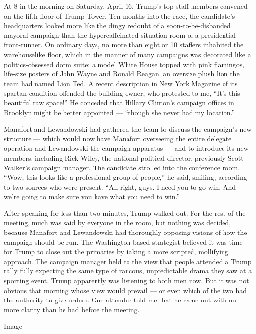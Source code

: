 At 8 in the morning on Saturday, April 16, Trump's top staff members
convened on the fifth floor of Trump Tower. Ten months into the race,
the candidate's headquarters looked more like the dingy redoubt of a
soon-to-be-disbanded mayoral campaign than the hypercaffeinated
situation room of a presidential front-runner. On ordinary days, no more
than eight or 10 staffers inhabited the warehouselike floor, which in
the manner of many campaigns was decorated like a politics-obsessed dorm
suite: a model White House topped with pink flamingos, life-size posters
of John Wayne and Ronald Reagan, an oversize plush lion the team had
named Lion Ted.
\href{http://nymag.com/daily/intelligencer/2016/04/inside-the-donald-trump-presidential-campaign.html}{A
recent description in New York Magazine} of its spartan condition
offended the building owner, who protested to me, ``It's this beautiful
raw space!'' He conceded that Hillary Clinton's campaign offices in
Brooklyn might be better appointed --- ``though she never had my
location.''

Manafort and Lewandowski had gathered the team to discuss the campaign's
new structure --- which would now have Manafort overseeing the entire
delegate operation and Lewandowski the campaign apparatus --- and to
introduce its new members, including Rick Wiley, the national political
director, previously Scott Walker's campaign manager. The candidate
strolled into the conference room. ``Wow, this looks like a professional
group of people,'' he said, smiling, according to two sources who were
present. ``All right, guys. I need you to go win. And we're going to
make sure you have what you need to win.''

After speaking for less than two minutes, Trump walked out. For the rest
of the meeting, much was said by everyone in the room, but nothing was
decided, because Manafort and Lewandowski had thoroughly opposing
visions of how the campaign should be run. The Washington-based
strategist believed it was time for Trump to close out the primaries by
taking a more scripted, mollifying approach. The campaign manager held
to the view that people attended a Trump rally fully expecting the same
type of raucous, unpredictable drama they saw at a sporting event. Trump
apparently was listening to both men now. But it was not obvious that
morning whose view would prevail --- or even which of the two had the
authority to give orders. One attendee told me that he came out with no
more clarity than he had before the meeting.

Image


